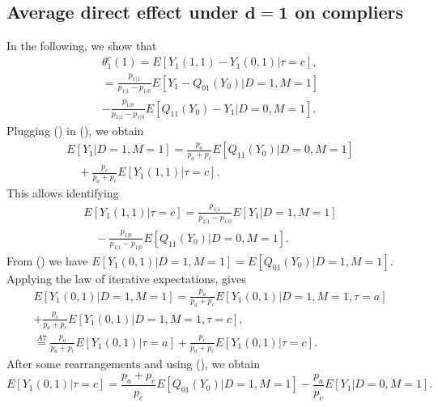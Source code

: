 \documentclass[a4paper,12pt]{article}
\begin{document}
 \doublespacing \pagestyle{plain}
\subsection{Average direct effect
under $\mathbf{d = 1}$ on compliers}
In the following, we show that
\begin{align*}
\theta_{1}^{c}(1) = E[Y_1(1,1)-Y_1(0,1)|\tau=c], \\ = 
\frac{p_{1|1}}{ p_{1|1} - p_{1|0}} E[Y_1-Q_{01}(Y_0) |D=1,M=1] \\ -\frac{p_{1|0}}{p_{1|1} - p_{1|0}}E[Q_{11}(Y_0)-Y_1|D=0,M=1].
\end{align*}
Plugging () in (), we obtain
\begin{equation*}
\begin{array}{rl}
E[Y_1|D=1,M=1] = \displaystyle \frac{p_a}{p_a + p_c}E[Q_{11}(Y_0)|D=0,M=1] \\
 \displaystyle \quad + \frac{p_c}{p_a + p_c} E[Y_1(1,1)|\tau=c].
\end{array}
\end{equation*}
This allows identifying
\begin{equation} 
\begin{array}{rl}
E[Y_1(1,1)|\tau=c] = \displaystyle \frac{p_{1|1}}{ p_{1|1} - p_{1|0}} E[Y_1|D=1,M=1] \\
 \displaystyle \quad -\frac{p_{1|0}}{p_{1|1} - p_{1|0}}E[Q_{11}(Y_0)|D=0,M=1].
\end{array}
\end{equation}
From () we have $E[Y_1(0,1)|D=1,M=1] = E[Q_{01}(Y_0)|D=1,M=1]$. Applying the law of iterative expectations, gives
\begin{align*}
E[Y_1(0,1)|D=1,M=1] = \frac{p_a}{p_a+p_c} E[Y_1(0,1)|D=1,M=1, \tau=a] \\+ \frac{p_c}{p_a+p_c}E[Y_1(0,1)|D=1,M=1,\tau= c], \\
\stackrel{A7}{=} \frac{p_a}{p_a+ p_c} E[Y_1(0,1)|\tau=a] + \frac{p_c}{p_a+p_c}E[Y_1(0,1)|\tau= c].
\end{align*}
After some rearrangements and using (), we obtain
\begin{equation*}
E[Y_1(0,1)|\tau= c]  = \frac{p_a+p_c}{p_c} E[Q_{01}(Y_0)|D=1,M=1] -   \frac{p_a}{p_c} E[Y_1|D=0,M=1].
\end{equation*}
\end{document}
